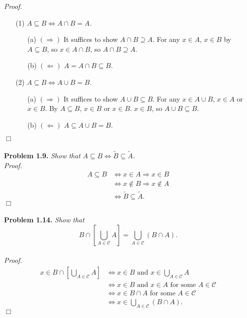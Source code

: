 \documentclass{article}
\begin{document}
\emph{Proof.}
\begin{enumerate}
\item[(1)]
\emph{$A \subseteq B \Longleftrightarrow A \cap B = A$.}
  \begin{enumerate}
  \item[(a)]
  \emph{$(\Longrightarrow)$}
  It suffices to show $A \cap B \supseteq A$.
  For any $x \in A$, $x \in B$ by $A \subseteq B$, so $x \in A \cap B$,
  so $A \cap B \supseteq A$.
  \item[(b)]
  \emph{$(\Longleftarrow)$}
  $A = A \cap B \subseteq B$.
  \end{enumerate}
\item[(2)]
\emph{$A \subseteq B \Leftrightarrow A \cup B = B$.}
  \begin{enumerate}
  \item[(a)]
  \emph{$(\Longrightarrow)$}
  It suffices to show $A \cup B \subseteq B$.
  For any $x \in A \cup B$, $x \in A$ or $x \in B$.
  By $A \subseteq B$, $x \in B$ or $x \in B$. $x \in B$,
  so $A \cup B \subseteq B$.
  \item[(b)]
  \emph{$(\Longleftarrow)$}
  $A \subseteq A \cup B = B$.
  \end{enumerate}
\end{enumerate}
$\Box$ \\\\



\textbf{Problem 1.9.}
\emph{Show that
$A \subseteq B \Leftrightarrow \widetilde{B} \subseteq \widetilde{A}$.} \\

\emph{Proof.}
\begin{align*}
A \subseteq B
& \Longleftrightarrow
x \in A \Rightarrow x \in B \\
& \Longleftrightarrow
x \not\in B \Rightarrow x \not\in A \\
& \Longleftrightarrow
\widetilde{B} \subseteq \widetilde{A}.
\end{align*}
$\Box$ \\\\



\textbf{Problem 1.14.}
\emph{Show that
$$B \cap \left[ \bigcup_{A \in \mathscr{C}} A \right]
= \bigcup_{A \in \mathscr{C}}(B \cap A).$$} \\

\emph{Proof.}
\begin{align*}
x \in B \cap \left[ \bigcup_{A \in \mathscr{C}} A \right]
& \Longleftrightarrow
x \in B \text{ and } x \in \bigcup_{A \in \mathscr{C}} A \\
& \Longleftrightarrow
x \in B \text{ and } x \in A \text{ for some } A \in \mathscr{C} \\
& \Longleftrightarrow
x \in B \cap A \text{ for some } A \in \mathscr{C} \\
& \Longleftrightarrow
x \in \bigcup_{A \in \mathscr{C}}(B \cap A).
\end{align*}
$\Box$ \\\\
\end{document}
